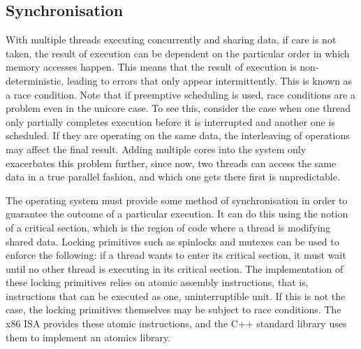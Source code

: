 \documentclass[bsc,frontabs,singlespacing,parskip,deptreport]{infthesis}
\begin{document}
\subsection{Synchronisation} \label{synchronisation-challenges}
With multiple threads executing concurrently and sharing data, if care is not taken, the result of execution can be dependent on the particular order in which memory accesses happen. This means that the result of execution is non-deterministic, leading to errors that only appear intermittently. This is known as a race condition. Note that if preemptive scheduling is used, race conditions are a problem even in the unicore case. To see this, consider the case when one thread only partially completes execution before it is interrupted and another one is scheduled. If they are operating on the same data, the interleaving of operations may affect the final result. Adding multiple cores into the system only exacerbates this problem further, since now, two threads can access the same data in a true parallel fashion, and which one gets there first is unpredictable. 

The operating system must provide some method of synchronisation in order to guarantee the outcome of a particular execution. It can do this using the notion of a critical section, which is the region of code where a thread is modifying shared data. Locking primitives such as spinlocks and mutexes can be used to enforce the following: if a thread wants to enter its critical section, it must wait until no other thread is executing in its critical section. The implementation of these locking primitives relies on atomic assembly instructions, that is, instructions that can be executed as one, uninterruptible unit. If this is not the case, the locking primitives themselves may be subject to race conditions. The x86 ISA provides these atomic instructions, and the C++ standard library uses them to implement an atomics library.
\end{document}
